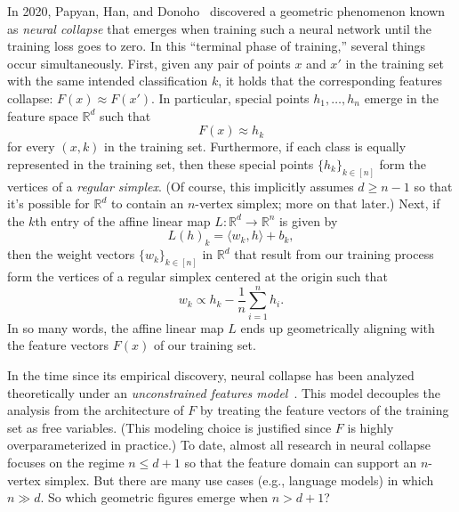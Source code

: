 \documentclass{article}
\theoremstyle{plain}
\theoremstyle{definition}
\begin{document}
In 2020, Papyan, Han, and Donoho~\cite{PapyanHD:20} discovered a geometric phenomenon known as \textit{neural collapse} that emerges when training such a neural network until the training loss goes to zero.
In this ``terminal phase of training,'' several things occur simultaneously.
First, given any pair of points $x$ and $x'$ in the training set with the same intended classification $k$, it holds that the corresponding features collapse: $F(x)\approx F(x')$.
In particular, special points $h_1,\ldots,h_n$ emerge in the feature space $\mathbb{R}^d$ such that
\[
F(x)\approx h_k
\]
for every $(x,k)$ in the training set.
Furthermore, if each class is equally represented in the training set, then these special points $\{h_k\}_{k\in[n]}$ form the vertices of a \textit{regular simplex}.
(Of course, this implicitly assumes $d\geq n-1$ so that it's possible for $\mathbb{R}^d$ to contain an $n$-vertex simplex; more on that later.)
Next, if the $k$th entry of the affine linear map $L\colon\mathbb{R}^d\to\mathbb{R}^n$ is given by
\[
L(h)_k
=\langle w_k,h\rangle+b_k,
\]
then the weight vectors $\{w_k\}_{k\in[n]}$ in $\mathbb{R}^d$ that result from our training process form the vertices of a regular simplex centered at the origin such that
\[
w_k
\propto h_k-\frac{1}{n}\sum_{i=1}^n h_i.
\]
In so many words, the affine linear map $L$ ends up geometrically aligning with the feature vectors $F(x)$ of our training set.

In the time since its empirical discovery, neural collapse has been analyzed theoretically under an \textit{unconstrained features model}~\cite{MixonPP:22}.
This model decouples the analysis from the architecture of $F$ by treating the feature vectors of the training set as free variables.
(This modeling choice is justified since $F$ is highly overparameterized in practice.)
To date, almost all research in neural collapse focuses on the regime $n\le d+1$ so that the feature domain can support an $n$-vertex simplex.
But there are many use cases (e.g., language models) in which $n\gg d$.
So which geometric figures emerge when $n>d+1$?
\end{document}
